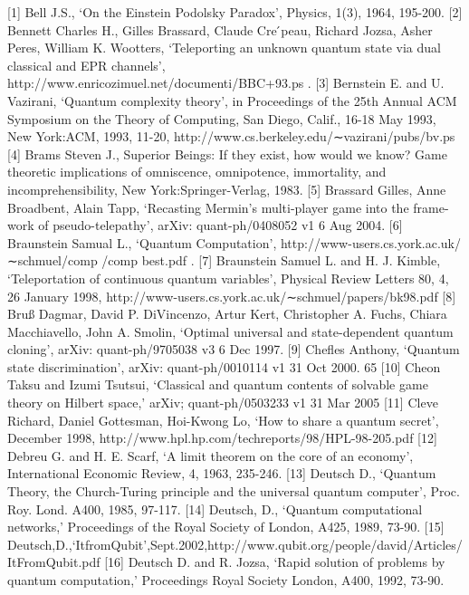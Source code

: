 \begin{verbatim*}

[1] Bell J.S., ‘On the Einstein Podolsky Paradox’, Physics, 1(3), 1964, 195-200.
[2] Bennett Charles H., Gilles Brassard, Claude Cre ́peau, Richard Jozsa, Asher Peres, William
K. Wootters, ‘Teleporting an unknown quantum state via dual classical and EPR channels’,
http://www.enricozimuel.net/documenti/BBC+93.ps .
[3] Bernstein E. and U. Vazirani, ‘Quantum complexity theory’, in Proceedings of the 25th Annual ACM
Symposium on the Theory of Computing, San Diego, Calif., 16-18 May 1993, New York:ACM, 1993,
11-20, http://www.cs.berkeley.edu/∼vazirani/pubs/bv.ps
[4] Brams Steven J., Superior Beings: If they exist, how would we know? Game theoretic implications of
omniscence, omnipotence, immortality, and incomprehensibility, New York:Springer-Verlag, 1983.
[5] Brassard Gilles, Anne Broadbent, Alain Tapp, ‘Recasting Mermin’s multi-player game into the frame-
work of pseudo-telepathy’, arXiv: quant-ph/0408052 v1 6 Aug 2004.
[6] Braunstein Samual L., ‘Quantum Computation’, http://www-users.cs.york.ac.uk/∼schmuel/comp
/comp best.pdf .
[7] Braunstein Samuel L. and H. J. Kimble, ‘Teleportation of continuous quantum variables’, Physical
Review Letters 80, 4, 26 January 1998, http://www-users.cs.york.ac.uk/∼schmuel/papers/bk98.pdf
[8] Bruß Dagmar, David P. DiVincenzo, Artur Kert, Christopher A. Fuchs, Chiara Macchiavello, John A. Smolin, ‘Optimal universal and state-dependent quantum cloning’, arXiv: quant-ph/9705038 v3 6
Dec 1997.
[9] Chefles Anthony, ‘Quantum state discrimination’, arXiv: quant-ph/0010114 v1 31 Oct 2000.
65
  [10] Cheon Taksu and Izumi Tsutsui, ‘Classical and quantum contents of solvable game theory on Hilbert space,’ arXiv; quant-ph/0503233 v1 31 Mar 2005
[11] Cleve Richard, Daniel Gottesman, Hoi-Kwong Lo, ‘How to share a quantum secret’, December 1998,
http://www.hpl.hp.com/techreports/98/HPL-98-205.pdf
[12] Debreu G. and H. E. Scarf, ‘A limit theorem on the core of an economy’, International Economic
Review, 4, 1963, 235-246.
[13] Deutsch D., ‘Quantum Theory, the Church-Turing principle and the universal quantum computer’,
Proc. Roy. Lond. A400, 1985, 97-117.
[14] Deutsch, D., ‘Quantum computational networks,’ Proceedings of the Royal Society of London, A425,
1989, 73-90.
[15] Deutsch,D.,‘ItfromQubit’,Sept.2002,http://www.qubit.org/people/david/Articles/ItFromQubit.pdf
[16] Deutsch D. and R. Jozsa, ‘Rapid solution of problems by quantum computation,’ Proceedings Royal
Society London, A400, 1992, 73-90.

\end{verbatim*}
